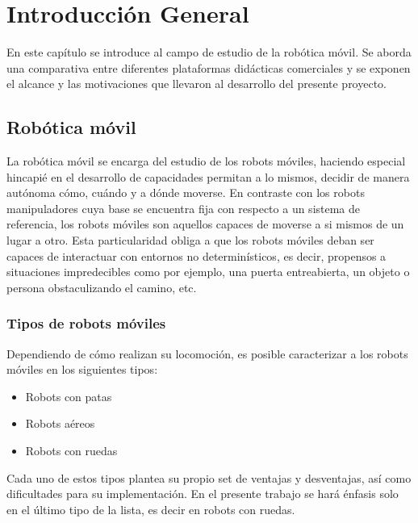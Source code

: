 \chapter{Introducción General}

\label{Capítulo1}
\label{IntroducciónGeneral}


\newcommand{\keyword}[1]{\textbf{#1}}
\newcommand{\tabhead}[1]{\textbf{#1}}
\newcommand{\code}[1]{\texttt{#1}}
\newcommand{\file}[1]{\texttt{\bfseries#1}}
\newcommand{\option}[1]{\texttt{\itshape#1}}
\newcommand{\grados}{$^{\circ}$}

En este capítulo se introduce al campo de estudio de la robótica móvil. Se aborda una comparativa entre diferentes plataformas didácticas comerciales y se exponen el alcance y las motivaciones que llevaron al desarrollo del presente proyecto.

\section{Robótica móvil}

La robótica móvil se encarga del estudio de los robots móviles, haciendo especial hincapié en el desarrollo de capacidades permitan a lo mismos, decidir de manera autónoma cómo, cuándo y a dónde moverse.\newline
En contraste con los robots manipuladores cuya base se encuentra fija con respecto a un sistema de referencia, los robots móviles son aquellos capaces de moverse a si mismos de un lugar a otro. Esta particularidad obliga a que los robots móviles deban ser capaces de interactuar con entornos no determinísticos, es decir, propensos a situaciones impredecibles como por ejemplo, una puerta entreabierta, un objeto o persona obstaculizando el camino, etc.\newline

\subsection{Tipos de robots móviles}

Dependiendo de cómo realizan su locomoción, es posible caracterizar a los robots móviles en los siguientes tipos:
\begin{itemize}
	\item{Robots con patas}
	\item{Robots aéreos}
	\item{Robots con ruedas}
\end{itemize}

Cada uno de estos tipos plantea su propio set de ventajas y desventajas, así como dificultades para su implementación. En el presente trabajo se hará énfasis solo en el último tipo de la lista, es decir en robots con ruedas.

